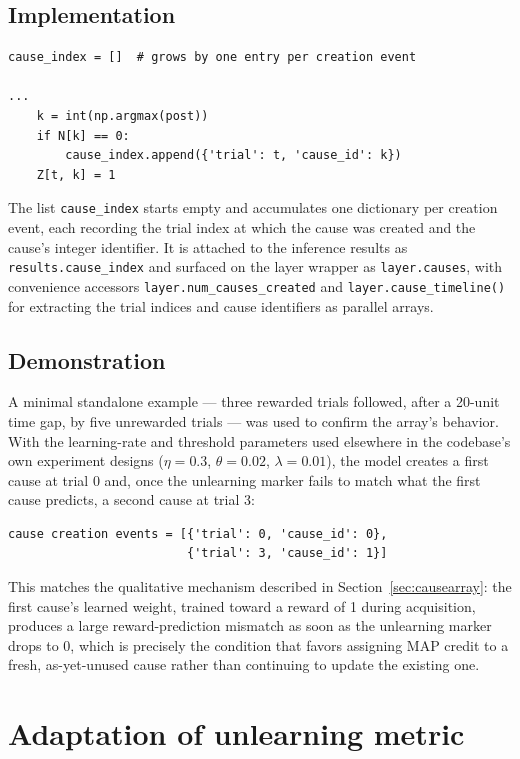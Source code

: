 \documentclass{surreydissertation}
\begin{document}
\subsection{Implementation}
 
\begin{verbatim}
cause_index = []  # grows by one entry per creation event
 
...
    k = int(np.argmax(post))
    if N[k] == 0:
        cause_index.append({'trial': t, 'cause_id': k})
    Z[t, k] = 1
\end{verbatim}
 
The list \texttt{cause\_index} starts empty and accumulates one dictionary
per creation event, each recording the trial index at which the cause was
created and the cause's integer identifier. It is attached to the
inference results as \texttt{results.cause\_index} and surfaced on the
layer wrapper as \texttt{layer.causes}, with convenience accessors
\texttt{layer.num\_causes\_created} and \texttt{layer.cause\_timeline()}
for extracting the trial indices and cause identifiers as parallel arrays.
 
\subsection{Demonstration}
 
A minimal standalone example --- three rewarded trials followed, after a
20-unit time gap, by five unrewarded trials --- was used to confirm the
array's behavior. With the learning-rate and threshold parameters used
elsewhere in the codebase's own experiment designs
($\eta = 0.3$, $\theta = 0.02$, $\lambda = 0.01$), the model creates a
first cause at trial 0 and, once the unlearning marker fails to match what
the first cause predicts, a second cause at trial 3:
\begin{verbatim}
cause creation events = [{'trial': 0, 'cause_id': 0},
                         {'trial': 3, 'cause_id': 1}]
\end{verbatim}

This matches the qualitative mechanism described in
Section~\ref{sec:causearray}: the first cause's learned weight, trained
toward a reward of 1 during acquisition, produces a large reward-prediction
mismatch as soon as the unlearning marker drops to 0, which is precisely
the condition that favors assigning MAP credit to a fresh, as-yet-unused
cause rather than continuing to update the existing one.

\section{Adaptation of unlearning metric}
\end{document}
